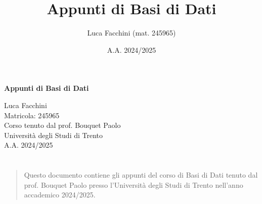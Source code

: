 \documentclass[twoside]{report}
\title{Appunti di Basi di Dati}
\author{Luca Facchini (mat. 245965)}
\date{A.A. 2024/2025}
\makeatletter
\renewenvironment{abstract}{%
    \if@twocolumn
        \section*{\abstractname}%
    \else
        \begin{center}%
            {\bfseries \abstractname\vspace{-.5em}\vspace{\z@}}%
        \end{center}%
        \small
        \begin{quotation}
    \fi}
    {\if@twocolumn\else\end{quotation}\fi}
\newcommand{\<}{\textless}
\renewcommand{\>}{\textgreater}
\makeatother
\begin{document}
    \begin{titlepage}
        \centering  %
        {\Huge\textbf{Appunti di Basi di Dati}} \\[1cm] %
        \vspace{0.5cm}
        
        {\Large Luca Facchini} \\ %
        \vspace{0.3cm}
        {\large Matricola: 245965} \\[2cm] %
        
        {\large Corso tenuto dal prof. Bouquet Paolo} \\[0.3cm] %
        {\large Università degli Studi di Trento} \\[1.5cm]
        
        {\large A.A. 2024/2025} \\[3cm] %
        
        \vfill
        \begin{abstract}
            Questo documento contiene gli appunti del corso di Basi di Dati tenuto dal prof. Bouquet Paolo presso l'Università degli Studi di Trento nell'anno accademico 2024/2025.
        \end{abstract}
        
        \vfill  %
    \end{titlepage}
    \tableofcontents

    \pagestyle{fancy}
    \fancyhead{}
    \fancyhead[RO,LE]{\leftmark}
    \fancyfoot{}
    \fancyfoot[LE,RO]{\thepage}

    
    
    
\end{document}
